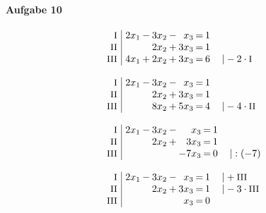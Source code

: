 \paragraph{Aufgabe 10}
\begin{equation*}
\begin{array}{l}
\setlength{\arraycolsep}{1pt}
\begin{array}{r|rcrcrcrl}
    \text{\small I } &\; 2x_{1} & - & 3x_{2} & - &  x_{3} & = & 1 &                              \\
   \text{\small II } &\;        &   & 2x_{2} & + & 3x_{3} & = & 1 &                              \\
  \text{\small III } &\; 4x_{1} & + & 2x_{2} & + & 3x_{3} & = & 6 & \quad|-2\cdot\text{\small I}   
\end{array}
\\ \\
\setlength{\arraycolsep}{1pt}
\begin{array}{r|rcrcrcrl}
    \text{\small I } &\; 2x_{1} & - & 3x_{2} & - &  x_{3} & = & 1 &                               \\
   \text{\small II } &\;        &   & 2x_{2} & + & 3x_{3} & = & 1 &                               \\
  \text{\small III } &\;        &   & 8x_{2} & + & 5x_{3} & = & 4 & \quad|-4\cdot\text{\small II}   
\end{array}
\\ \\
\setlength{\arraycolsep}{1pt}
\begin{array}{r|rcrcrcrl}
    \text{\small I } &\; 2x_{1} & - & 3x_{2} & - &   x_{3} & = & 1 &             \\
   \text{\small II } &\;        &   & 2x_{2} & + &  3x_{3} & = & 1 &             \\
  \text{\small III } &\;        &   &        &   & -7x_{3} & = & 0 & \quad|:(-7)   
\end{array}
\\ \\
\setlength{\arraycolsep}{1pt}
\begin{array}{r|rcrcrcrl}
    \text{\small I } &\; 2x_{1} & - & 3x_{2} & - &  x_{3} & = & 1 & \quad|+\text{\small III}       \\
   \text{\small II } &\;        &   & 2x_{2} & + & 3x_{3} & = & 1 & \quad|-3\cdot\text{\small III} \\
  \text{\small III } &\;        &   &        &   &  x_{3} & = & 0 &                                  
\end{array}

\end{array}
\end{equation*}
